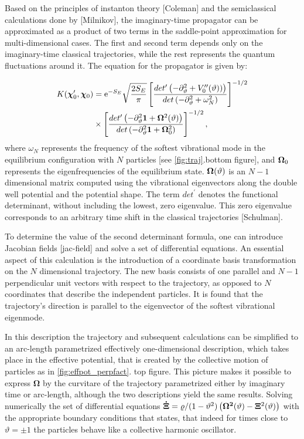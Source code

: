 \documentclass[prb,twocolumn,showpacs,preprintnumbers,amsmath,amssymb, superscriptaddress]{revtex4-2}
\newcommand{\n}{N}
\newcommand{\e}{\text e}
\newcommand{\1}{{1\hspace*{-0.5ex} \textrm{l} \hspace*{0.5ex}}}
\begin{document}
Based on the principles of instanton theory [Coleman] and the semiclassical calculations done by [Milnikov], the imaginary-time propagator can be approximated as a product of two terms in the saddle-point approximation for multi-dimensional cases. The first and second term depends only on the imaginary-time classical trajectories, while the rest represents the quantum fluctuations around it. The equation for the propagator is given by:

\begin{align}
K(\mathbold{\chi}_0^\prime, \mathbold{\chi}_0) &= \e^{-S_E} \sqrt{ \frac{2S_E}{\pi}} \left[ \frac{det^\prime \left(-\partial_\vartheta^2 + V^{\prime \prime}_0 (\vartheta))   \right)}{det\left(-\partial_\vartheta^2 + \omega^2_N   \right)}  \right]^{-1/2}\\ \nonumber
&\times \left[  \frac{det^\prime \left(-\partial_\vartheta^2 {\bf{1}} + {\bf{\Omega}}^2 (\vartheta)   \right)}{det\left(-\partial_\vartheta^2 {\bf{1}}+ {\bf{\Omega}}^2_0   \right)}   \right]^{-1/2},
\end{align}
where $\omega_N$ represents the frequency of the softest vibrational mode in the equilibrium configuration with $\n$ particles [see \ref{fig:traj}.bottom figure], and ${\bf{\Omega}}_0$ represents the eigenfrequencies of the equilibrium state. ${\bf{\Omega}}(\vartheta)$ is an $\n - 1$ dimensional matrix computed using the vibrational eigenvectors along the double well potential and the potential shape. The term $det^\prime$ denotes the functional determinant, without including the lowest, zero eigenvalue. This zero eigenvalue corresponds to an arbitrary time shift in the classical trajectories [Schulman].

To determine the value of the second determinant formula, one can introduce Jacobian fields [jac-field] and solve a set of differential equations. An essential aspect of this calculation is the introduction of a coordinate basis transformation on the $\n$ dimensional trajectory. The new basis consists of one parallel and $\n-1$ perpendicular unit vectors with respect to the trajectory, as opposed to $\n$ coordinates that describe the independent particles. It is found that the trajectory's direction is parallel to the eigenvector of the softest vibrational eigenmode.

In this description the trajectory and subsequent calculations can be simplified to an arc-length parametrized effectively one-dimensional description, which takes place in the effective potential, that is created by the collective motion of particles as in \ref{fig:effpot_perpfact}. top figure. This picture makes it possible to express $\mathbold{\Omega}$ by the curvitare of the trajectory parametrized either by imaginary time or arc-length, although the two descriptions yield the same results. Solving numerically the set of differential equations ${\bf{\dot{\Xi}}} = \varrho /(1 - \vartheta^2)\left({\bf{\Omega}^2}(\vartheta) - {\bf{\Xi}}^2(\vartheta)\right)$ with the appropriate boundary conditions that states, that indeed for times close to $\vartheta = \pm 1$ the particles behave like a collective harmonic oscillator.
\end{document}
